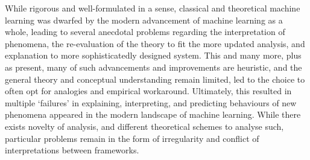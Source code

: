 \documentclass[
  journal=largetwo,
  year=2025,
  volume=37,
]{cup-journal}
\begin{document}
While rigorous and well-formulated in a sense, classical and theoretical machine learning was dwarfed by the modern advancement of machine learning as a whole, leading to several anecdotal problems regarding the interpretation of phenomena, the re-evaluation of the theory to fit the more updated analysis, and explanation to more sophisticatedly designed system. This and many more, plus as present, many of such advancements and improvements are heuristic, and the general theory and conceptual understanding remain limited, led to the choice to often opt for analogies and empirical workaround. Ultimately, this resulted in multiple `failures' in explaining, interpreting, and predicting behaviours of new phenomena appeared in the modern landscape of machine learning. While there exists novelty of analysis, and different theoretical schemes to analyse such, particular problems remain in the form of irregularity and conflict of interpretations between frameworks. 
\end{document}
